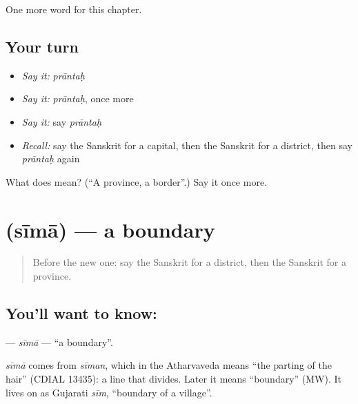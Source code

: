 \begin{grammarlens}[title={What you've built}]
One more word for this chapter.
\end{grammarlens}

\subsection*{Your turn}
\begin{itemize}
\raggedright
  \item \emph{Say it:} \emph{prāntaḥ}
  \item \emph{Say it:} \emph{prāntaḥ}, once more
  \item \emph{Say it:} say \emph{prāntaḥ}
  \item \emph{Recall:} say the Sanskrit for a capital, then the Sanskrit for a district, then say \emph{prāntaḥ} again
\end{itemize}

\begin{tcolorbox}[breakable,colback=teal!4,colframe=teal!35!black,title={Before you move on}]
What does  mean? (\textquotedblleft{}A province, a border\textquotedblright{}.) Say it once more.
\end{tcolorbox}
\section[\texorpdfstring{\sk{सीमा} (sīmā)}{सीमा (sīmā)}]{ (sīmā) — a boundary}

\label{lesson:SA-C195-sima}



\begin{quote}
Before the new one: say the Sanskrit for a district, then the Sanskrit for a province.
\end{quote}

\subsection*{You'll want to know: }
\textbf{} — \emph{sīmā} — \textquotedblleft{}a boundary\textquotedblright{}.

\begin{cousinweb}
\emph{sīmā} comes from \emph{sīman}, which in the Atharvaveda means \textquotedblleft{}the parting of the hair\textquotedblright{} (CDIAL 13435): a line that divides. Later it means \textquotedblleft{}boundary\textquotedblright{} (MW). It lives on as Gujarati \emph{sīm}, \textquotedblleft{}boundary of a village\textquotedblright{}.
\end{cousinweb}

